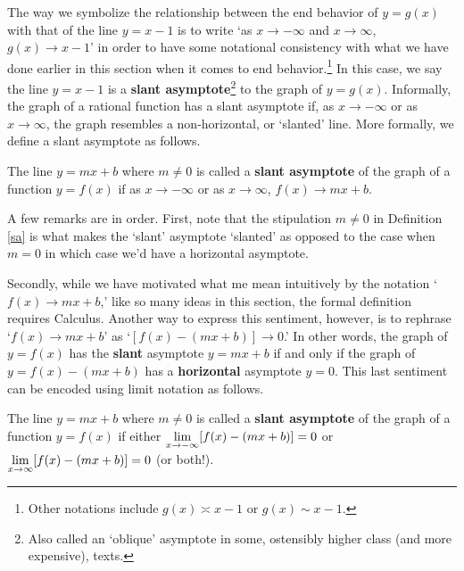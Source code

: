 The way we symbolize the relationship between the end behavior of $y=g(x)$ with that of the line $y=x-1$ is to write `as $x \rightarrow  -\infty$ and $x \rightarrow \infty$, $g(x) \rightarrow x-1$' in order to have some notational consistency with what we have done earlier in this section when it comes to end behavior.\footnote{Other notations include $g(x) \asymp x-1$ or $g(x) \sim x-1$.}  In this case, we say the line $y=x-1$ is a    \textbf{slant asymptote}\footnote{Also called an `oblique' asymptote in some, ostensibly higher class (and more expensive), texts.}  to the graph of $y=g(x)$.  Informally, the graph of a rational function has a slant asymptote if, as $x \rightarrow -\infty$ or as $x \rightarrow \infty$, the graph resembles a non-horizontal, or `slanted' line.  More formally, we define a slant asymptote as follows.


\medskip


\colorbox{ResultColor}{\bbm

\begin{defn} \label{sa} The line $y = mx+b$ where $m \neq 0$  is called a \textbf{slant asymptote} of the graph of a function $y=f(x)$ if as $x \rightarrow -\infty$ or as $x \rightarrow \infty$, $f(x)  \rightarrow mx+b$.


\end{defn}
\ebm}

\medskip


A few remarks are in order.  First, note that the stipulation $m \neq 0$ in Definition \ref{sa} is what makes the `slant' asymptote `slanted' as opposed to the case when $m=0$ in which case we'd have a horizontal asymptote.  

Secondly, while we have motivated what me mean intuitively by the notation `$f(x)  \rightarrow mx+b$,' like so many ideas in this section, the formal definition requires Calculus.  Another way to express this sentiment, however, is to rephrase `$f(x)  \rightarrow mx+b$' as `$[f(x) - (mx+b)] \rightarrow 0$.'  In other words, the graph of $y=f(x)$ has the \textbf{slant} asymptote $y = mx+b$ if and only if the graph of $y = f(x) - (mx+b)$ has a \textbf{horizontal} asymptote $y=0$.   This last sentiment can be encoded using limit notation as follows.

\medskip


\colorbox{ResultColor}{\bbm

\begin{defn} \label{sareprise} The line $y = mx+b$ where $m \neq 0$  is called a \textbf{slant asymptote} of the graph of a function $y=f(x)$ if either $\ds{\lim_{x \rightarrow -\infty} [f(x) - (mx+b)] = 0}$ or $\ds{\lim_{x \rightarrow \infty} [f(x) - (mx+b)] = 0}$ (or both!).

\end{defn}
\ebm}

